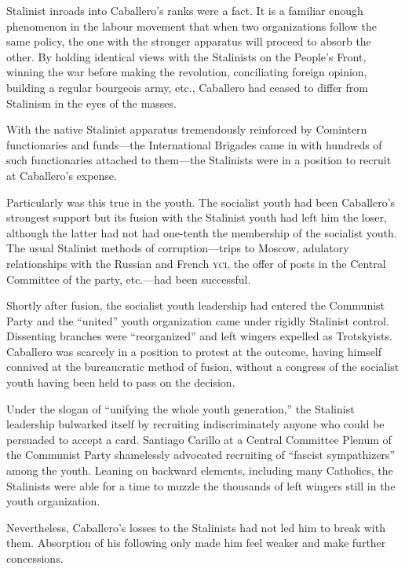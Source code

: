 Stalinist inroads into Caballero’s ranks were a fact. It is a familiar enough phenomenon in the labour movement that when two organizations follow the same policy, the one with the stronger apparatus will proceed to absorb the other. By holding identical views with the Stalinists on the People’s Front, winning the war before making the revolution, conciliating foreign opinion, building a regular bourgeois army, etc., Caballero had ceased to differ from Stalinism in the eyes of the masses.

With the native Stalinist apparatus tremendously reinforced by Comintern functionaries and funds---the International Brigades came in with hundreds of such functionaries attached to them---the Stalinists were in a position to recruit at Caballero’s expense.

Particularly was this true in the youth. The socialist youth had been Caballero’s strongest support but its fusion with the Stalinist youth had left him the loser, although the latter had not had one-tenth the membership of the socialist youth. The usual Stalinist methods of corruption---trips to Moscow, adulatory relationships with the Russian and French \textsc{yci}, the offer of posts in the Central Committee of the party, etc.---had been successful.

Shortly after fusion, the socialist youth leadership had entered the Communist Party and the ``united'' youth organization came under rigidly Stalinist control. Dissenting branches were ``reorganized'' and left wingers expelled as Trotskyists. Caballero was scarcely in a position to protest at the outcome, having himself connived at the bureaucratic method of fusion, without a congress of the socialist youth having been held to pass on the decision.

Under the slogan of ``unifying the whole youth generation,'' the Stalinist leadership bulwarked itself by recruiting indiscriminately anyone who could be persuaded to accept a card. Santiago Carillo at a Central Committee Plenum of the Communist Party shamelessly advocated recruiting of ``fascist sympathizers'' among the youth. Leaning on backward elements, including many Catholics, the Stalinists were able for a time to muzzle the thousands of left wingers still in the youth organization.

Nevertheless, Caballero’s losses to the Stalinists had not led him to break with them. Absorption of his following only made him feel weaker and make further concessions.

